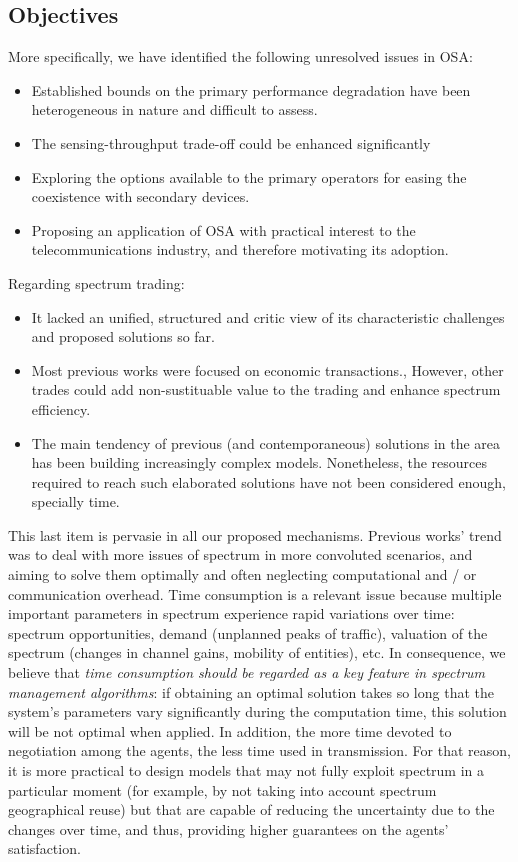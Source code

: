 \subsection{Objectives}
More specifically, we have identified the following unresolved issues in OSA: 
\begin{itemize}
\item Established bounds on the primary performance degradation have been heterogeneous in nature and difficult to assess.
\item The sensing-throughput trade-off could be enhanced significantly 
\item Exploring the options available to the primary operators for easing the coexistence with secondary devices.
\item Proposing an application of OSA with practical interest to the telecommunications industry, and therefore motivating its adoption.
\end{itemize}

Regarding spectrum trading:
\begin{itemize}
\item It lacked an unified, structured and critic view of its characteristic challenges and proposed solutions so far.
\item Most previous works were focused on economic transactions., However, other trades could add non-sustituable value to the trading and enhance spectrum efficiency.
\item  The main tendency of previous (and contemporaneous) solutions in the area has been building increasingly complex models. Nonetheless, the resources required to reach such elaborated solutions have not been considered enough, specially time.
\end{itemize}
This last item is pervasie in all our proposed mechanisms.
Previous works' trend was to deal with more issues of spectrum in more convoluted scenarios, and aiming to solve them optimally and often neglecting computational and / or communication overhead.
Time consumption is a relevant issue because multiple important parameters in spectrum experience rapid variations over time: spectrum opportunities, demand (unplanned peaks of traffic), valuation of the spectrum (changes in channel gains, mobility of entities), etc.
In consequence, we believe that \emph{time consumption should be regarded as a key feature in spectrum management algorithms}: if obtaining an optimal solution takes so long that the system’s parameters vary significantly during the computation time, this solution will be not optimal when applied. 
In addition, the more time devoted to negotiation among the agents, the less time used in transmission. 
For that reason, it is more practical to design models that may not fully exploit spectrum in a particular moment (for example, by not taking into account spectrum geographical reuse) but that are capable of reducing the uncertainty due to the changes over time, and thus, providing higher guarantees on the agents’ satisfaction. 

